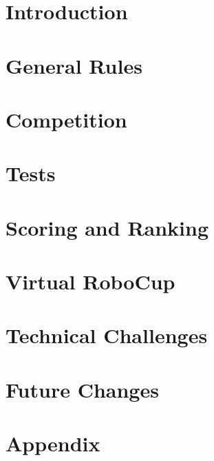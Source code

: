 \documentclass[11pt, twoside, openright, a4paper, chapterprefix]{scrbook}
\begin{document}


\pagestyle{empty}

\tableofcontents

\pagestyle{plain}




\chapter{Introduction}






\chapter{General Rules}


\chapter{Competition}


\chapter{Tests}



\chapter{Scoring and Ranking}


\chapter{Virtual RoboCup}
\label{cha: VRC}


\chapter{Technical Challenges} \label{cha:TechnicalChallenges}
\label{cha: TCHA}


\chapter{Future Changes}
\label{cha: Future}


\chapter{Appendix}

%


%

%

%



\printabx
\printidx
\end{document}
